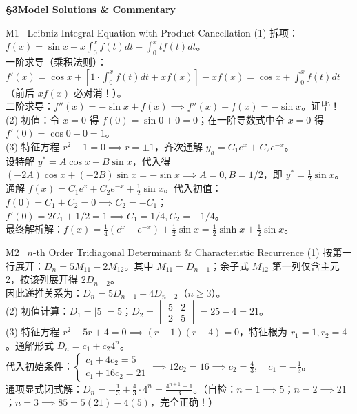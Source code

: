 \documentclass[a4paper,11pt]{article}
\begin{document}
{\Large\sffamily\bfseries\color{navy} \S 3\quad Model Solutions \& Commentary}

\vspace{2pt}

\begin{solution}{M1 \textperiodcentered\ Leibniz Integral Equation with Product Cancellation}
\small
(1) 拆项：$f(x) = \sin x + x\int_0^x f(t)dt - \int_0^x tf(t)dt$。\\
一阶求导（乘积法则）：$f'(x) = \cos x + \left[1\cdot\int_0^x f(t)dt + xf(x)\right] - xf(x) = \cos x + \int_0^x f(t)dt$（前后 $xf(x)$ 必对消！）。\\
二阶求导：$f''(x) = -\sin x + f(x) \implies f''(x) - f(x) = -\sin x$。证毕！\\
(2) 初值：令 $x=0$ 得 $f(0) = \sin 0 + 0 = 0$；在一阶导数式中令 $x=0$ 得 $f'(0) = \cos 0 + 0 = 1$。\\
(3) 特征方程 $r^2 - 1 = 0 \implies r = \pm 1$，齐次通解 $y_h = C_1 e^x + C_2 e^{-x}$。\\
设特解 $y^* = A\cos x + B\sin x$，代入得 $(-2A)\cos x + (-2B)\sin x = -\sin x \implies A=0, B=1/2$，即 $y^* = \frac{1}{2}\sin x$。\\
通解 $f(x) = C_1 e^x + C_2 e^{-x} + \frac{1}{2}\sin x$。代入初值：$f(0) = C_1 + C_2 = 0 \implies C_2 = -C_1$；$f'(0) = 2C_1 + 1/2 = 1 \implies C_1 = 1/4, C_2 = -1/4$。\\
最终解析解：$f(x) = \frac{1}{4}(e^x - e^{-x}) + \frac{1}{2}\sin x = \frac{1}{2}\sinh x + \frac{1}{2}\sin x$。
\end{solution}

\vspace{1.5pt}

\begin{solution}{M2 \textperiodcentered\ $n$-th Order Tridiagonal Determinant \& Characteristic Recurrence}
\small
(1) 按第一行展开：$D_n = 5 M_{11} - 2 M_{12}$。其中 $M_{11} = D_{n-1}$；余子式 $M_{12}$ 第一列仅含主元 2，按该列展开得 $2 D_{n-2}$。\\
因此递推关系为：$D_n = 5D_{n-1} - 4D_{n-2}$（$n \ge 3$）。\\
(2) 初值计算：$D_1 = |5| = 5$；$D_2 = \begin{vmatrix} 5 & 2 \\ 2 & 5 \end{vmatrix} = 25 - 4 = 21$。\\
(3) 特征方程 $r^2 - 5r + 4 = 0 \implies (r-1)(r-4) = 0$，特征根为 $r_1 = 1, r_2 = 4$。通解形式 $D_n = c_1 + c_2 4^n$。\\
代入初始条件：$\begin{cases} c_1 + 4c_2 = 5 \\ c_1 + 16c_2 = 21 \end{cases} \implies 12c_2 = 16 \implies c_2 = \frac{4}{3}, \quad c_1 = -\frac{1}{3}$。\\
通项显式闭式解：$D_n = -\frac{1}{3} + \frac{4}{3}\cdot 4^n = \frac{4^{n+1} - 1}{3}$。（自检：$n=1 \implies 5$；$n=2 \implies 21$；$n=3 \implies 85 = 5(21)-4(5)$，完全正确！）
\end{solution}
\end{document}
